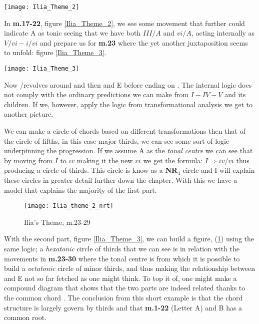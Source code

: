 \begin{figure*}[h!]
\texttt{[image: Ilia\_Theme\_2]}
	\caption{Ilia's Theme 2}
	\label{Ilia_Theme_2}
\end{figure*}

In \textbf{m.17-22}, figure \ref{Ilia_Theme_2}, we see some movement that further could indicate A as tonic seeing that we have both \(III/A\) and \(vi/A\), acting internally as \(V/vi-i/vi\) and prepare us for \textbf{m.23} where the yet another juxtaposition seems to unfold: figure \ref{Ilia_Theme_3}.

\begin{figure*}[h!]
\texttt{[image: Ilia\_Theme\_3]}
	\caption{Ilia's Theme 3}
	\label{Ilia_Theme_3}
\end{figure*}

Now \dflat/\ciss revolves around \bflat and then \bflat and E before ending on . The internal logic does not comply with the ordinary predictions we can make from \(I-IV-V\) and its children. If we, however, apply the logic from transformational analysis we get to another picture. 

We can make a circle of chords based on different transformations then that of the circle of fifths, in this case major thirds, we can see some sort of logic underpinning the progression. If we assume A as the \textit{tonal centre} we can see that by moving from \(I\) to \(iv\) making it the new \(vi\) we get the formula: \({I}\Rightarrow{iv/vi}\) thus producing a circle of thirds. This circle is know as a \textbf{NR\(_{4}\)} circle and I will explain these circles in greater detail further down the chapter. With this we have a model that explains the majority of the first part. 

\begin{figure}[h!]
\center
\texttt{[image: Ilia\_theme\_2\_nrt]}
	\caption{Ilia's Theme, m.23-29}
	\label{Ilia_theme_2_nrt}
\end{figure}

With the second part, figure \ref{Ilia_Theme_3}, we can build a figure, (\ref{Ilia_theme_2_nrt}) using the same logic; a \textit{hexatonic} circle of thirds that we can see is in relation with the movements in \textbf{m.23-30} where the tonal centre is \ciss from which it is possible to build a \textit{octatonic} circle of minor thirds, and thus making the relationship between \bflat and E not so far fetched as one might think. To top it of, one might make a compound diagram that shows that the two parts are indeed related thanks to the common chord \ciss. The conclusion from this short example is that the chord structure is largely govern by thirds and that \textbf{m.1-22} (Letter A) and B has a common root.

